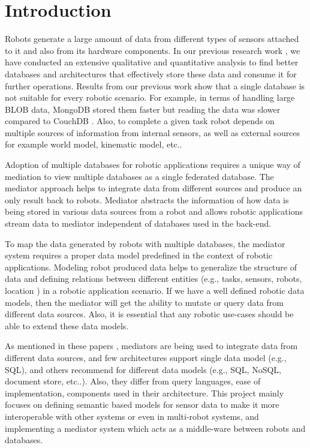 

    \chapter{Introduction}

Robots generate a large amount of data from different types of sensors attached to it and also from its hardware components. In our previous research work \cite{ravichandranworkbench}, we have conducted an extensive qualitative and quantitative analysis to find better databases and architectures that effectively store these data and consume it for further operations. Results from our previous work show that a single database is not suitable for every robotic scenario. For example, in terms of handling large BLOB data, MongoDB stored them faster but reading the data was slower compared to CouchDB \cite{ravichandranworkbench}. Also, to complete a given task robot depends on multiple sources of information from internal sensors, as well as external sources for example world model, kinematic model, etc.. 

Adoption of multiple databases for robotic applications requires a unique way of mediation to view multiple databases as a single federated database. The mediator approach helps to integrate data from different sources and produce an only result back to robots. Mediator abstracts the information of how data is being stored in various data sources from a robot and allows robotic applications stream data to mediator independent of databases used in the back-end.

To map the data generated by robots with multiple databases, the mediator system requires a proper data model predefined in the context of robotic applications. Modeling robot produced data helps to generalize the structure of data and defining relations between different entities (e.g., tasks,  sensors, robots, location ) in a robotic application scenario. If we have a well defined robotic data models, then the mediator will get the ability to mutate or query data from different data sources. Also, it is essential that any robotic use-cases should be able to extend these data models.


As mentioned in these papers \cite{ahmed1991pegasus,fahl1993amos,arens1996query,chawathe1994tsimmis,chawathe1994tsimmis,shoens1993rufus}, mediators are being used to integrate data from different data sources, and few architectures support single data model (e.g., SQL), and others recommend for different data models (e.g., SQL, NoSQL, document store, etc..). Also, they differ from query languages, ease of implementation, components used in their architecture. This project mainly focuses on defining semantic based models for sensor data to make it more interoperable with other systems or even in multi-robot systems, and implementing a mediator system which acts as a middle-ware between robots and databases. 

